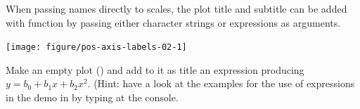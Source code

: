 \documentclass[krantz2]{krantz}\usepackage{knitr}
\begin{document}
When passing names directly to scales, the plot title and subtitle can be added with function  by passing either character strings or \Rlang expressions as arguments.

\begin{knitrout}\footnotesize
{}\color{fgcolor}\begin{kframe}
\begin{alltt}
 \hlopt{+}
  \hlstd{(} \hlstd{=} \hlstd{)} \hlopt{+}
  \hlstd{(} \hlstd{=} \hlstd{)} \hlopt{+}
  \hlstd{(} \hlstd{=} \hlstd{)} \hlopt{+}
  \hlstd{(} \hlstd{=} \hlstd{,}
           \hlstd{=} \hlstd{)}
\end{alltt}
\end{kframe}

{\centering \texttt{[image: figure/pos-axis-labels-02-1]} 

}


\end{knitrout}

\begin{playground}
Make an empty plot () and add to it as title an \Rlang expression producing $y = b_0 + b_1 x + b_2 x^2$. (Hint: have a look at the examples for the use of expressions in the  demo in \Rlang by typing  at the \Rlang console.
\end{playground}

\end{document}
